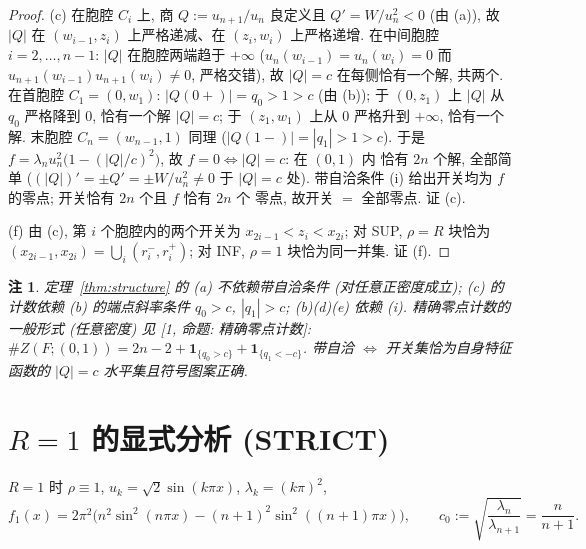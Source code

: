 \documentclass[UTF8]{ctexart}
\newtheorem{remark}[theorem]{注}
\begin{document}
\begin{proof}
(c) 在胞腔 $C_i$ 上, 商 $Q:=u_{n+1}/u_n$ 良定义且
$Q'=W/u_n^2<0$ (由 (a)), 故 $|Q|$ 在 $(w_{i-1},z_i)$ 上严格递减、在
$(z_i,w_i)$ 上严格递增. 在中间胞腔 $i=2,\dots,n-1$: $|Q|$ 在胞腔两端趋于
$+\infty$ ($u_n(w_{i-1})=u_n(w_i)=0$ 而 $u_{n+1}(w_{i-1})u_{n+1}(w_i)\neq0$,
严格交错), 故 $|Q|=c$ 在每侧恰有一个解, 共两个. 在首胞腔 $C_1=(0,w_1)$:
$|Q(0+)|=q_0>1>c$ (由 (b)); 于 $(0,z_1)$ 上 $|Q|$ 从 $q_0$ 严格降到 $0$,
恰有一个解 $|Q|=c$; 于 $(z_1,w_1)$ 上从 $0$ 严格升到 $+\infty$, 恰有一个解.
末胞腔 $C_n=(w_{n-1},1)$ 同理 ($|Q(1-)|=|q_1|>1>c$). 于是
$f=\lambda_nu_n^2\bigl(1-(|Q|/c)^2\bigr)$, 故 $f=0\iff|Q|=c$: 在 $(0,1)$ 内
恰有 $2n$ 个解, 全部简单 ($(|Q|)'=\pm Q'=\pm W/u_n^2\neq0$ 于 $|Q|=c$ 处).
带自洽条件 (i) 给出开关均为 $f$ 的零点; 开关恰有 $2n$ 个且 $f$ 恰有 $2n$ 个
零点, 故开关 $=$ 全部零点. 证 (c).

(f) 由 (c), 第 $i$ 个胞腔内的两个开关为 $x_{2i-1}<z_i<x_{2i}$; 对 SUP,
$\rho=R$ 块恰为 $(x_{2i-1},x_{2i})=\bigcup_i(r_i^-,r_i^+)$; 对 INF,
$\rho=1$ 块恰为同一并集. 证 (f).
\end{proof}

\begin{remark}
定理~\ref{thm:structure} 的 (a) 不依赖带自洽条件 (对任意正密度成立);
(c) 的计数依赖 (b) 的端点斜率条件 $q_0>c$, $|q_1|>c$; (b)(d)(e) 依赖 (i).
精确零点计数的一般形式 (任意密度) 见 [1, 命题: 精确零点计数]:
$\#Z(F;(0,1))=2n-2+\mathbf1_{\{q_0>c\}}+\mathbf1_{\{q_1<-c\}}$.
带自洽 $\iff$ 开关集恰为自身特征函数的 $|Q|=c$ 水平集且符号图案正确.
\end{remark}

\section{\texorpdfstring{$R=1$}{R=1} 的显式分析 (STRICT)}\label{sec:r1}

$R=1$ 时 $\rho\equiv1$, $u_k=\sqrt2\sin(k\pi x)$, $\lambda_k=(k\pi)^2$,
\begin{equation}\label{eq:f1}
	f_1(x)=2\pi^2\bigl(n^2\sin^2(n\pi x)-(n+1)^2\sin^2((n+1)\pi x)\bigr),
	\qquad
	c_0:=\sqrt{\frac{\lambda_n}{\lambda_{n+1}}}=\frac{n}{n+1}.
\end{equation}
\end{document}
